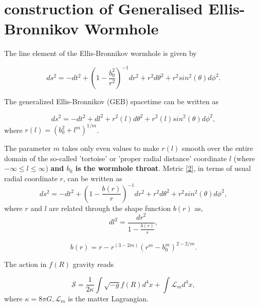 \section{construction of Generalised Ellis-Bronnikov Wormhole}\label{sec2}

The line element of the Ellis-Bronnikov wormhole is given by

\begin{equation}
\label{1}
ds^2=-dt^2+\left(1-\frac{b_0^2}{r^2} \right)^{-1}dr^2+r^2 d\theta^2+r^2 sin^2(\theta)d\phi^2.
\end{equation}

The generalized Ellis-Bronnikov (GEB) spacetime can be written as

\begin{equation}
\label{2}
ds^2=-dt^2+dl^2+r^2(l)d\theta^2+r^2(l)sin^2(\theta)d\phi^2,
\end{equation}
where $r(l)=(b_0^2+l^m)^{1/m}$.

The parameter $m$ takes only even values to make $r(l)$ smooth over the entire domain of the so-called 'tortoise' or 'proper radial distance' coordinate $l$ (where $-\infty \leq l\leq \infty$) \textbf{and $b_0$ is the wormhole throat}. Metric \eqref{2}, in terms of usual radial coordinate $r$, can be written as
\begin{equation}
\label{3}
ds^2=-dt^2+\left(1-\frac{b(r)}{r} \right)^{-1}dr^2+r^2 d\theta^2+r^2 sin^2(\theta)d\phi^2,
\end{equation}
where $r$ and $l$ are related through the shape function $b(r)$ as,
\begin{equation}
\label{4}
dl^2=\frac{dr^2}{1-\frac{b(r)}{r}},
\end{equation}

\begin{equation}\label{5}
b(r)=r-r^{(3-2m)}\left(r^m-b_0^m\right)^{2-2/m}.
\end{equation}

The action in $f(R)$ gravity reads

\begin{equation}
\label{6}
\mathcal{S}=\frac{1}{2\kappa}\int \sqrt{-g}f(R)d^4x+\int \mathcal{L}_m
d^4x,
\end{equation}
where $\kappa=8\pi G, \mathcal{L}_m$ is the matter Lagrangian.

